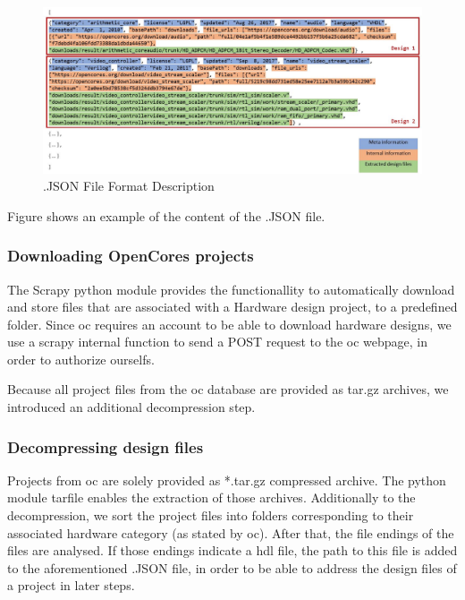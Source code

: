 \begin{figure}[tb]
	\centering
	\includegraphics[width=\textwidth,keepaspectratio]{../pictures/jsonFileFormatDescription.JPG}
	\caption{.JSON File Format Description}
	\label{fig:jsonFormat}
\end{figure}

Figure  shows an example of the content of the .JSON file. 

\subsubsection{Downloading OpenCores projects}
The Scrapy python module provides the functionallity to automatically download and
store files that are associated with a Hardware design project, to a predefined
folder. Since \gls{oc} requires an account to be able to download hardware designs, 
we use a scrapy internal function to send a POST request to the \gls{oc} webpage,
in order to authorize ourselfs. 

Because all project files from the \gls{oc} database are provided as tar.gz archives,
we introduced an additional decompression step.  

\subsubsection{Decompressing design files} 
Projects from \gls{oc} are solely provided as *.tar.gz compressed archive. The \gls{python}
module tarfile enables the extraction of those archives. Additionally 
to the decompression, we sort the project files into folders corresponding to 
their associated hardware category (as stated by \gls{oc}). After that, the file 
endings of the files are analysed. If those endings indicate a \gls{hdl} file, the path 
to this file is added to the aforementioned .JSON file, in order to be able to
address the design files of a project in later steps.

